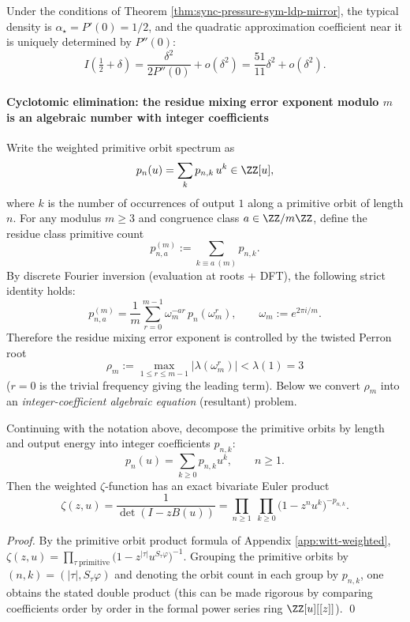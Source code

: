 \begin{remark}\label{cor:sync-ldp-quadratic-locked}
Under the conditions of Theorem \ref{thm:sync-pressure-sym-ldp-mirror}, the typical density is \(\alpha_\star=P'(0)=1/2\), and the quadratic approximation coefficient near it is uniquely determined by \(P''(0)\):
\[
I\!\left(\tfrac12+\delta\right)=\frac{\delta^2}{2P''(0)}+o(\delta^2)
=\frac{51}{11}\delta^2+o(\delta^2).
\]
\end{remark}

\paragraph{Cyclotomic elimination: the residue mixing error exponent modulo \texorpdfstring{$m$}{m} is an algebraic number with integer coefficients}
Write the weighted primitive orbit spectrum as
\[
p_n(u)=\sum_{k}p_{n,k}\,u^k\in\ZZ[u],
\]
where $k$ is the number of occurrences of output $1$ along a primitive orbit of length $n$. For any modulus $m\ge 3$ and congruence class $a\in\ZZ/m\ZZ$, define the residue class primitive count
\[
p_{n,a}^{(m)}:=\sum_{k\equiv a\ (m)}p_{n,k}.
\]
By discrete Fourier inversion (evaluation at roots + DFT), the following strict identity holds:
\[
p_{n,a}^{(m)}=\frac{1}{m}\sum_{r=0}^{m-1}\omega_m^{-ar}\,p_n(\omega_m^r),
\qquad \omega_m:=e^{2\pi i/m}.
\]
Therefore the residue mixing error exponent is controlled by the twisted Perron root
\[
\rho_m:=\max_{1\le r\le m-1}|\lambda(\omega_m^r)|<\lambda(1)=3
\]
($r=0$ is the trivial frequency giving the leading term). Below we convert $\rho_m$ into an \emph{integer-coefficient algebraic equation} (resultant) problem.

\begin{proposition}[Energy-resolved Euler product: \texorpdfstring{$\zeta(z,u)=\prod_{n,k}(1-z^n u^k)^{-p_{n,k}}$}{zeta(z,u)=prod(1-z^n u^k)^(-p_{n,k})}]\label{prop:sync-bivariate-euler-product}
Continuing with the notation above, decompose the primitive orbits by length and output energy into integer coefficients \(p_{n,k}\):
\[
p_n(u)=\sum_{k\ge 0}p_{n,k}u^k,\qquad n\ge 1.
\]
Then the weighted \(\zeta\)-function has an exact bivariate Euler product
\[
\zeta(z,u)=\frac{1}{\det(I-zB(u))}
=\prod_{n\ge 1}\ \prod_{k\ge 0}\bigl(1-z^n u^k\bigr)^{-p_{n,k}}.
\]
\end{proposition}
\begin{proof}
By the primitive orbit product formula of Appendix \ref{app:witt-weighted},
\(
\zeta(z,u)=\prod_{\tau\ \mathrm{primitive}}\bigl(1-z^{|\tau|}u^{S_\tau\varphi}\bigr)^{-1}
\).
Grouping the primitive orbits by \((n,k)=(|\tau|,S_\tau\varphi)\) and denoting the orbit count in each group by \(p_{n,k}\), one obtains the stated double product (this can be made rigorous by comparing coefficients order by order in the formal power series ring \(\ZZ[u][[z]]\)). \qed
\end{proof}

